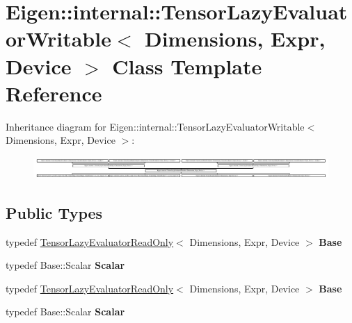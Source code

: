 \hypertarget{class_eigen_1_1internal_1_1_tensor_lazy_evaluator_writable}{}\section{Eigen\+:\+:internal\+:\+:Tensor\+Lazy\+Evaluator\+Writable$<$ Dimensions, Expr, Device $>$ Class Template Reference}
\label{class_eigen_1_1internal_1_1_tensor_lazy_evaluator_writable}
Inheritance diagram for Eigen\+:\+:internal\+:\+:Tensor\+Lazy\+Evaluator\+Writable$<$ Dimensions, Expr, Device $>$\+:\begin{figure}[H]
\begin{center}
\leavevmode
\includegraphics[height=0.847201cm]{class_eigen_1_1internal_1_1_tensor_lazy_evaluator_writable}
\end{center}
\end{figure}
\subsection*{Public Types}
\begin{DoxyCompactItemize}
\item 
\mbox{\label{class_eigen_1_1internal_1_1_tensor_lazy_evaluator_writable_a842c7473413575f8fbd4a3d82f431832}} 
typedef \hyperlink{class_eigen_1_1internal_1_1_tensor_lazy_evaluator_read_only}{Tensor\+Lazy\+Evaluator\+Read\+Only}$<$ Dimensions, Expr, Device $>$ {\bfseries Base}
\item 
\mbox{\label{class_eigen_1_1internal_1_1_tensor_lazy_evaluator_writable_afb52b58a2fc877fdf7cd3d3b3e20add5}} 
typedef Base\+::\+Scalar {\bfseries Scalar}
\item 
\mbox{\label{class_eigen_1_1internal_1_1_tensor_lazy_evaluator_writable_a842c7473413575f8fbd4a3d82f431832}} 
typedef \hyperlink{class_eigen_1_1internal_1_1_tensor_lazy_evaluator_read_only}{Tensor\+Lazy\+Evaluator\+Read\+Only}$<$ Dimensions, Expr, Device $>$ {\bfseries Base}
\item 
\mbox{\label{class_eigen_1_1internal_1_1_tensor_lazy_evaluator_writable_afb52b58a2fc877fdf7cd3d3b3e20add5}} 
typedef Base\+::\+Scalar {\bfseries Scalar}
\end{DoxyCompactItemize}

